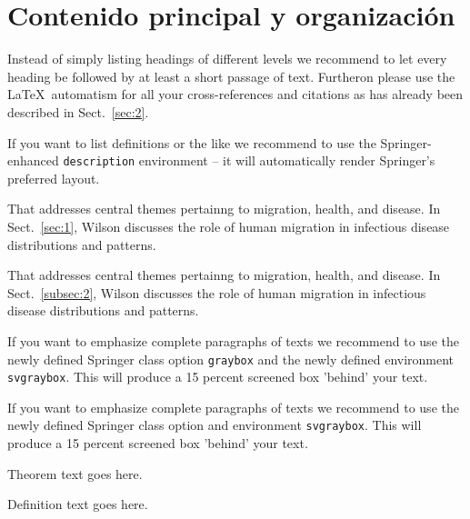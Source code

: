 \section{Contenido principal y organización}
\label{sec:3}
Instead of simply listing headings of different levels we recommend to let every heading be followed by at least a short passage of text. Furtheron please use the \LaTeX\ automatism for all your cross-references and citations as has already been described in Sect.~\ref{sec:2}.

If you want to list definitions or the like we recommend to use the Springer-enhanced \verb|description| environment -- it will automatically render Springer's preferred layout.

\begin{description}[Type 1]
	\item[Type 1]{That addresses central themes pertainng to migration, health, and disease. In Sect.~\ref{sec:1}, Wilson discusses the role of human migration in infectious disease distributions and patterns.}
	\item[Type 2]{That addresses central themes pertainng to migration, health, and disease. In Sect.~\ref{subsec:2}, Wilson discusses the role of human migration in infectious disease distributions and patterns.}
\end{description}

\begin{svgraybox}
	If you want to emphasize complete paragraphs of texts we recommend to use the newly defined Springer class option \verb|graybox| and the newly defined environment \verb|svgraybox|. This will produce a 15 percent screened box 'behind' your text.

	If you want to emphasize complete paragraphs of texts we recommend to use the newly defined Springer class option and environment \verb|svgraybox|. This will produce a 15 percent screened box 'behind' your text.
\end{svgraybox}

\begin{theorem}
	Theorem text goes here.
\end{theorem}

\begin{definition}
	Definition text goes here.
\end{definition}

